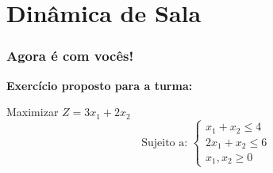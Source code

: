 \section{Dinâmica de Sala}

\begin{frame}
\frametitle{Agora é com vocês!}
\textbf{Exercício proposto para a turma:}

\vspace{0.5cm}
Maximizar $Z = 3x_1 + 2x_2$
\[ \text{Sujeito a: } \begin{cases} x_1 + x_2 \leq 4 \\ 2x_1 + x_2 \leq 6 \\ x_1, x_2 \geq 0 \end{cases} \]
\end{frame}
